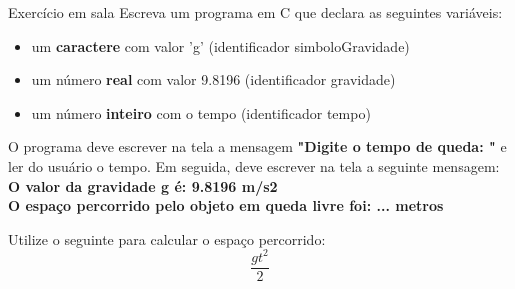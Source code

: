 \documentclass[portuguese,10pt,xcolor=table]{beamer}
\begin{document}
	\begin{frame}
	\begin{alertblock}{Exercício em sala}
	Escreva um programa em C que declara as seguintes variáveis:
	\begin{itemize}
		\item um \textbf{caractere} com valor 'g' (identificador simboloGravidade)
		\item um número \textbf{real} com valor 9.8196 (identificador gravidade)
		\item um número \textbf{inteiro} com o tempo (identificador tempo)
	\end{itemize}
	
	O programa deve escrever na tela a mensagem \textbf{"Digite o tempo de queda: "} e ler do usuário o tempo. Em seguida, deve escrever na tela a seguinte mensagem:\\
	\textbf{O valor da gravidade g é: 9.8196 m/s2}\\
	\textbf{O espaço percorrido pelo objeto em queda livre foi: ... metros}

	Utilize o seguinte para calcular o espaço percorrido:
	$$ \frac{gt^2}{2}$$
	
	\end{alertblock}


	\end{frame}


	
\end{document}
